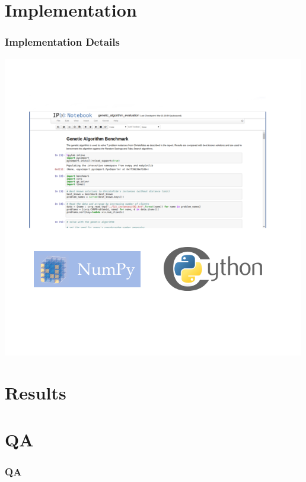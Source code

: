 \documentclass{beamer}
\begin{document}
\section{Implementation}

\begin{frame}
\frametitle{Implementation Details}
\begin{center}
\includegraphics[scale=0.4]{figs/tools}

\end{center}
\end{frame}

\section{Results}
\begin{frame}
\frametitle{}
\begin{center}
\end{center}
\end{frame}


\section{QA}
\begin{frame}
\frametitle{QA}
\begin{center}
\end{center}
\end{frame}
\end{document}

